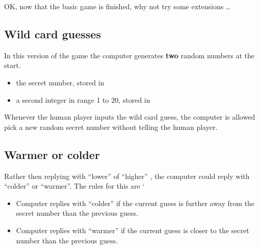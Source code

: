 \documentclass{coderdojo}
\begin{document}
OK, now that the basic game is finished, why not  try some extensions \ldots\

\subsection{Wild card guesses}

In this version of the game the computer generates {\bfseries two} random numbers at the start.
\begin{itemize}
\item the secret number, stored in 
\item a second integer in range 1 to 20, stored in  
\end{itemize}

Whenever the human player inputs the wild card guess, the computer is allowed pick a new random secret number without telling the human player.

\subsection{Warmer or colder}

Rather then replying with ``lower'' of ``higher'' , the computer could reply with ``colder'' or ``warmer''. The rules for this are 
`\begin{itemize}
\item Computer replies with ``colder'' if the current guess is further away from the secret number than the previous guess.
\item Computer replies with ``warmer'' if the current guess is closer to the secret number than the previous guess.
\end{itemize}
\end{document}
